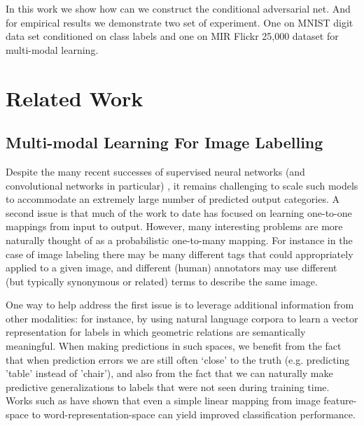 \documentclass{article} %
\begin{document}
In this work we show how can we construct the conditional adversarial net. And for empirical
results we demonstrate two set of experiment. One on MNIST digit data set conditioned on class
labels and one on MIR Flickr 25,000 dataset \cite{huiskes08} for multi-modal learning.

\section{Related Work}

\subsection{Multi-modal Learning For Image Labelling}

Despite the many recent successes of supervised neural networks  (and convolutional networks in particular) \cite{Krizhevsky-2012, szegedy2014going},
it remains challenging to scale such models to accommodate an extremely large number of predicted output categories. A second issue is
that much of the work to date has focused on learning one-to-one mappings from input to output. However, many
interesting problems are more naturally thought of as a probabilistic one-to-many mapping. For instance in the case of image labeling
there may be many different tags that could appropriately applied to a given image, and different (human) annotators may
use different (but typically synonymous or related) terms to describe the same image.

One way to help address the first issue is to leverage additional information from other modalities:
for instance, by using natural language corpora to learn a vector representation for labels in which geometric relations are semantically meaningful.
When making predictions in such spaces, we benefit from the fact that when prediction errors
we are still often `close' to the truth (e.g. predicting 'table' instead of 'chair'), and also from the fact that we can naturally make predictive generalizations
to labels that were not seen during training time. Works such as \cite{frome2013devise} have shown that even a
simple linear mapping from image feature-space to word-representation-space can yield improved classification performance.
\end{document}

